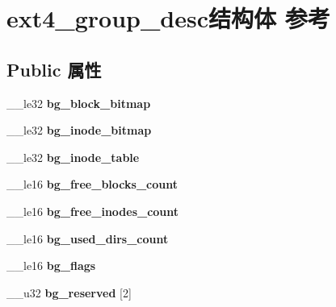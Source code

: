 \hypertarget{structext4__group__desc}{}\section{ext4\+\_\+group\+\_\+desc结构体 参考}
\label{structext4__group__desc}
\subsection*{Public 属性}
\begin{DoxyCompactItemize}
\item 
\mbox{\label{structext4__group__desc_a37239920205f94e1613d10e597b8e048}} 
\+\_\+\+\_\+le32 {\bfseries bg\+\_\+block\+\_\+bitmap}
\item 
\mbox{\label{structext4__group__desc_a68fb86c332f9e9d9207ee4eefd4013ff}} 
\+\_\+\+\_\+le32 {\bfseries bg\+\_\+inode\+\_\+bitmap}
\item 
\mbox{\label{structext4__group__desc_ab9ea8576fff9e5cee0d5b8191944bfeb}} 
\+\_\+\+\_\+le32 {\bfseries bg\+\_\+inode\+\_\+table}
\item 
\mbox{\label{structext4__group__desc_ad49225aeaf0dcff052283c1be652999e}} 
\+\_\+\+\_\+le16 {\bfseries bg\+\_\+free\+\_\+blocks\+\_\+count}
\item 
\mbox{\label{structext4__group__desc_a5d5b0a9c7f819c19bc226f9f879106eb}} 
\+\_\+\+\_\+le16 {\bfseries bg\+\_\+free\+\_\+inodes\+\_\+count}
\item 
\mbox{\label{structext4__group__desc_a41209d79255dba425b93cd7bbb09b03c}} 
\+\_\+\+\_\+le16 {\bfseries bg\+\_\+used\+\_\+dirs\+\_\+count}
\item 
\mbox{\label{structext4__group__desc_a0dc34bebb2da2e6bbce358b2a2d2d32d}} 
\+\_\+\+\_\+le16 {\bfseries bg\+\_\+flags}
\item 
\mbox{\label{structext4__group__desc_a91e4dca3c0cdf3b5f1b17060c36c933a}} 
\+\_\+\+\_\+u32 {\bfseries bg\+\_\+reserved} \mbox{[}2\mbox{]}
\item 

\end{DoxyCompactItemize}
